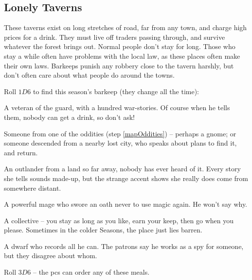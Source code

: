 \begin{multicols}{2}

\subsection{Lonely Taverns}
\label{lonelyTaverns}

These taverns exist on long stretches of road, far from any town, and
charge high prices for a drink. They must live off traders passing
through, and survive whatever the forest brings out. Normal people don't
stay for long. Those who stay a while often have problems with the local
law, as these places often make their own laws. Barkeeps punish any
robbery close to the tavern harshly, but don't often care about what
people do around the towns.


Roll $1D6$ to find this season's barkeep (they change all the time):

\begin{dlist}
  \item
  A veteran of the \gls{guard}, with a hundred war-stories. Of course
  when he tells them, nobody can get a drink, so don't ask!
  \item
  Someone from one of the oddities (step \ref{mapOddities}) -- perhaps a gnome; or someone descended from a nearby lost city, who speaks about plans to find it, and return.
  \item
  An outlander from a land so far away, nobody has ever heard of it.
  Every story she tells sounds made-up, but the strange accent shows she really does come from somewhere distant.
  \item
  A powerful mage who swore an oath never to use magic again.
  He won't say why.
  \item
  A collective -- you stay as long as you like, earn your keep, then go
  when you please. Sometimes in the colder Seasons, the place just lies
  barren.
  \item
  A dwarf who records all he can.
  The patrons say he works as a spy for someone, but they disagree about whom.
\end{dlist}


Roll $3D6$ -- the \glspl{pc} can order any of these meals.

\newcommand\menuItem[3][(\arabic{r12} \glspl{cp})]{%
  \randomdozen%
  \randomthree%
  \randomfourB%
  \ifodd\value{enumi}
    \randomthreeC%
    \randomfour%
  \fi
  \item
  \textbf{#2:}
  #3
  #1
}


\end{multicols}
